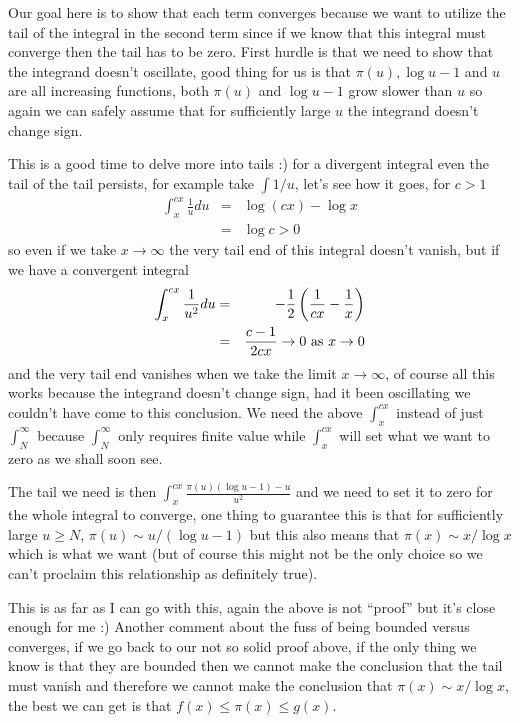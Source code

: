 \documentclass[aps,preprint,preprintnumbers,nofootinbib,showpacs,prd]{revtex4-1}
\newcommand{\nbea}{\begin{eqnarray*}}
\newcommand{\neea}{\end{eqnarray*}}
\begin{document}
Our goal here is to show that each term converges because we want to utilize the tail of the integral in the second term since if we know that this integral must converge then the tail has to be zero. First hurdle is that we need to show that the integrand doesn't oscillate, good thing for us is that $\pi(u), \log u - 1$ and $u$ are all increasing functions, both $\pi(u)$ and $\log u - 1$ grow slower than $u$ so again we can safely assume that for sufficiently large $u$ the integrand doesn't change sign.

This is a good time to delve more into tails :) for a divergent integral even the tail of the tail persists, for example take $\int 1/u$, let's see how it goes, for $c > 1$
%
\nbea
\int_x^{cx} \frac{1}{u} du & = & \log(cx) - \log x \\
& = & \log c > 0
\neea
%
so even if we take $x\to\infty$ the very tail end of this integral doesn't vanish, but if we have a convergent integral
%
\nbea
\int_x^{cx} \frac{1}{u^2} du & = & -\frac{1}{2}\left(\frac{1}{cx} - \frac{1}{x}\right) \\
& = & \frac{c-1}{2cx} \to 0 {\rm~as~} x\to 0
\neea
%
and the very tail end vanishes when we take the limit $x\to\infty$, of course all this works because the integrand doesn't change sign, had it been oscillating we couldn't have come to this conclusion. We need the above $\int_x^{cx}$ instead of just $\int_N^\infty$ because $\int_N^\infty$ only requires finite value while $\int_x^{cx}$ will set what we want to zero as we shall soon see.

The tail we need is then $\int_x^{cx} \frac{\pi(u)(\log u - 1) - u}{u^2}$ and we need to set it to zero for the whole integral to converge, one thing to guarantee this is that for sufficiently large $u \ge N$, $\pi(u) \sim u/(\log u - 1)$ but this also means that $\pi(x) \sim x/\log x$ which is what we want (but of course this might not be the only choice so we can't proclaim this relationship as definitely true).

This is as far as I can go with this, again the above is not ``proof'' but it's close enough for me :) Another comment about the fuss of being bounded versus converges, if we go back to our not so solid proof above, if the only thing we know is that they are bounded then we cannot make the conclusion that the tail must vanish and therefore we cannot make the conclusion that $\pi(x) \sim x/\log x$, the best we can get is that $f(x) \le \pi(x) \le g(x)$.
\end{document}
